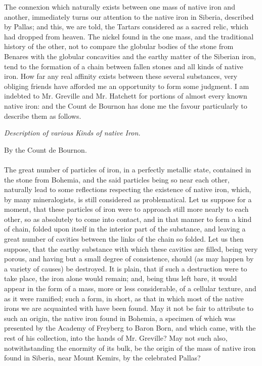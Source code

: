 \documentclass[a4paper, 12pt, oneside]{article}
\begin{document}
The connexion which naturally exists between one mass of native iron and another, immediately turns our attention to the native iron in Siberia, described by Pallas; and this, we are told, the Tartars considered as a sacred relic, which had dropped from heaven. The nickel found in the one mass, and the traditional history of the other, not to compare the globular bodies of the stone from Benares with the globular concavities and the earthy matter of the Siberian iron, tend to the formation of a chain between fallen stones and all kinds of native iron. How far any real affinity exists between these several substances, very obliging friends have afforded me an opportunity to form some judgment. I am indebted to Mr. Greville and Mr. Hatchett for portions of almost every known native iron: and the Count de Bournon has done me the favour particularly to describe them as follows.
\begin{center}
\emph{Description of various Kinds of native Iron.}
\end{center}
\begin{center}
By the Count de Bournon.
\end{center}
\paragraph{}
The great number of particles of iron, in a perfectly metallic state, contained in the stone from Bohemia, and the said particles being so near each other, naturally lead to some reflections respecting the existence of native iron, which, by many mineralogists, is still considered as problematical. Let us suppose for a moment, that these particles of iron were to approach still more nearly to each other, so as absolutely to come into contact, and in that manner to form a kind of chain, folded upon itself in the interior part of the substance, and leaving a great number of cavities between the links of the chain so folded. Let us then suppose, that the earthy substance with which these cavities are filled, being very porous, and having but a small degree of consistence, should (as may happen by a variety of causes) be destroyed. It is plain, that if such a destruction were to take place, the iron alone would remain; and, being thus left bare, it would appear in the form of a mass, more or less considerable, of a cellular texture, and as it were ramified; such a form, in short, as that in which most of the native irons we are acquainted with have been found. May it not be fair to attribute to such an origin, the native iron found in Bohemia, a specimen of which was presented by the Academy of Freyberg to Baron Born, and which came, with the rest of his collection, into the hands of Mr. Greville? May not such also, notwithstanding the enormity of its bulk, be the origin of the mass of native iron found in Siberia, near Mount Kemirs, by the celebrated Pallas?
\end{document}
